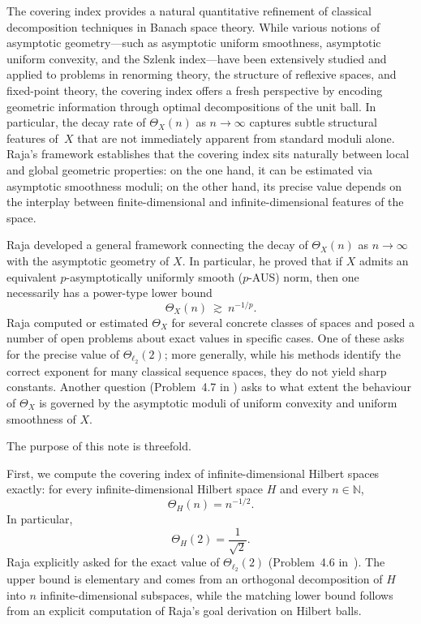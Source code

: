 \documentclass[reqno,11pt]{amsart}
\theoremstyle{plain}
\theoremstyle{definition}
\theoremstyle{remark}
\newcommand{\elltwo}{\ell_2}
\begin{document}
The covering index provides a natural quantitative refinement of classical decomposition techniques in Banach space theory.  While various notions of asymptotic geometry---such as asymptotic uniform smoothness, asymptotic uniform convexity, and the Szlenk index---have been extensively studied and applied to problems in renorming theory, the structure of reflexive spaces, and fixed-point theory, the covering index offers a fresh perspective by encoding geometric information through optimal decompositions of the unit ball.  In particular, the decay rate of $\Theta_X(n)$ as $n\to\infty$ captures subtle structural features of~$X$ that are not immediately apparent from standard moduli alone.  Raja's framework establishes that the covering index sits naturally between local and global geometric properties: on the one hand, it can be estimated via asymptotic smoothness moduli; on the other hand, its precise value depends on the interplay between finite-dimensional and infinite-dimensional features of the space.

Raja developed a general framework connecting the decay of $\Theta_X(n)$ as $n\to\infty$ with the asymptotic geometry of $X$.  In particular, he proved that if $X$ admits an equivalent $p$-asymptotically uniformly smooth ($p$-AUS) norm, then one necessarily has a power-type lower bound
\[
\Theta_X(n)\ \gtrsim\ n^{-1/p}.
\]
Raja computed or estimated $\Theta_X$ for several concrete classes of spaces and posed a number of open problems about exact values in specific cases.  One of these asks for the precise value of $\Theta_{\elltwo}(2)$; more generally, while his methods identify the correct exponent for many classical sequence spaces, they do not yield sharp constants.  Another question (Problem~4.7 in \cite{RajaCoveringIndex}) asks to what extent the behaviour of $\Theta_X$ is governed by the asymptotic moduli of uniform convexity and uniform smoothness of $X$.\smallskip

The purpose of this note is threefold.\smallskip

First, we compute the covering index of infinite-dimensional Hilbert spaces exactly:
for every infinite-dimensional Hilbert space $H$ and every $n\in\mathbb N$,
\[
\Theta_H(n)=n^{-1/2}.
\]
In particular,
\[
\Theta_H(2)=\frac1{\sqrt2}.
\]
Raja explicitly asked for the exact value of $\Theta_{\ell_2}(2)$
(Problem~4.6 in~\cite{RajaCoveringIndex}).
The upper bound is elementary and comes from an orthogonal decomposition of $H$
into $n$ infinite-dimensional subspaces, while the matching lower bound follows
from an explicit computation of Raja's goal derivation on Hilbert balls.
\end{document}
